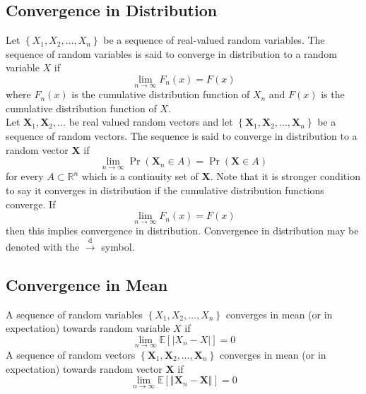\documentclass[11pt]{report} %
\begin{document}
\subsection{Convergence in Distribution}

Let $\left\{X_{1}, X_{2}, \dots, X_{n} \right\}$ be a sequence of real-valued random variables. The sequence of random variables is said to converge in distribution to a random variable $X$ if
\begin{equation}
\lim_{n\to \infty}F_{n}\left(x\right) = F\left(x\right)
\end{equation}
where $F_{n}\left(x\right)$ is the cumulative distribution function of $X_{n}$ and $F\left(x\right)$ is the cumulative distribution function of $X$. \\

Let $\mathbf{X}_{1}, \mathbf{X}_{2}, \dots$ be real valued random vectors and let $\left\{\mathbf{X}_{1}, \mathbf{X}_{2}, \dots, \mathbf{X}_{n} \right\}$ be a sequence of random vectors. The sequence is said to converge in distribution to a random vector $\mathbf{X}$ if
\begin{equation}
\lim_{n\to\infty}\operatorname{Pr}\left(\mathbf{X}_{n}\in A\right) = \operatorname{Pr}\left(\mathbf{X}\in A\right)
\end{equation}
for every $A\subset \mathbb{R}^{n}$ which is a continuity set of $\mathbf{X}$. Note that it is stronger condition to say it converges in distribution if the cumulative distribution functions converge. If 
\begin{equation}
\lim_{n\to \infty}F_{n}\left(x\right) = F\left(x\right)
\end{equation}
then this implies convergence in distribution. Convergence in distribution may be denoted with the $\overset{\mathrm{d}}\to$ symbol.

\subsection{Convergence in Mean}

A sequence of random variables $\left\{X_{1}, X_{2}, \dots, X_{n} \right\}$ converges in mean (or in expectation) towards random variable $X$ if
\begin{equation}
\lim_{n\to\infty}\mathbb{E}\left[\left|X_{n} - X\right|\right] = 0
\end{equation}
A sequence of random vectors $\left\{\mathbf{X}_{1}, \mathbf{X}_{2}, \dots, \mathbf{X}_{n} \right\}$ converges in mean (or in expectation) towards random vector $\mathbf{X}$ if
\begin{equation}
\lim_{n\to\infty}\mathbb{E}\left[\left\Vert\mathbf{X}_{n} - \mathbf{X}\right\Vert\right] = 0
\end{equation}
\end{document}
